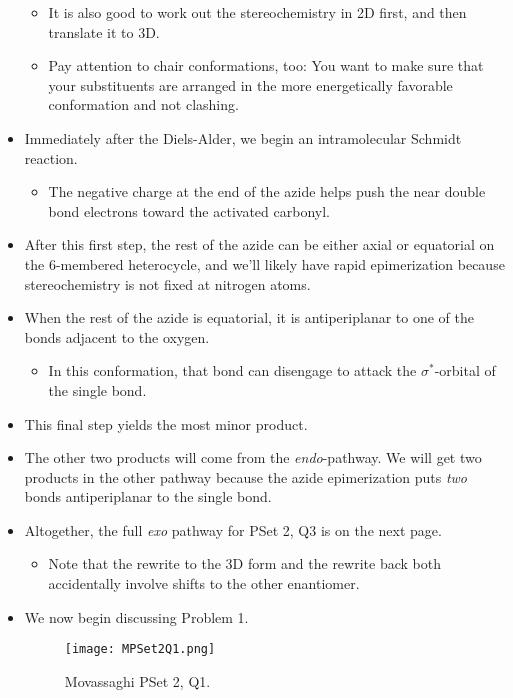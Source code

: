 \documentclass[../notes.tex]{subfiles}
\begin{document}
\begin{itemize}
\begin{itemize}
        \item It is also good to work out the stereochemistry in 2D first, and then translate it to 3D.
        \item Pay attention to chair conformations, too: You want to make sure that your substituents are arranged in the more energetically favorable conformation and not clashing.
    \end{itemize}
    \item Immediately after the Diels-Alder, we begin an intramolecular Schmidt reaction.
    \begin{itemize}
        \item The negative charge at the end of the azide helps push the near double bond electrons toward the activated carbonyl.
    \end{itemize}
    \item After this first step, the rest of the azide can be either axial or equatorial on the 6-membered heterocycle, and we'll likely have rapid epimerization because stereochemistry is not fixed at nitrogen atoms.
    \item When the rest of the azide is equatorial, it is antiperiplanar to one of the  bonds adjacent to the oxygen.
    \begin{itemize}
        \item In this conformation, that bond can disengage to attack the $\sigma^*$-orbital of the  single bond.
    \end{itemize}
    \item This final step yields the most minor product.
    \item The other two products will come from the \emph{endo}-pathway. We will get two products in the other pathway because the azide epimerization puts \emph{two}  bonds antiperiplanar to the  single bond.
    \item Altogether, the full \emph{exo} pathway for PSet 2, Q3 is on the next page.
    \begin{itemize}
        \item Note that the rewrite to the 3D form and the rewrite back both accidentally involve shifts to the other enantiomer.
    \end{itemize}
    
    \item We now begin discussing Problem 1.
    \begin{figure}[h!]
        \centering
        \texttt{[image: MPSet2Q1.png]}
        \caption{Movassaghi PSet 2, Q1.}

\end{figure}
\end{itemize}
\end{document}
